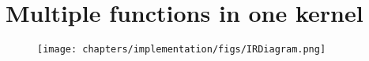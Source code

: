 \section{Multiple functions in one kernel}

\begin{figure}[!htb]
    \texttt{[image: chapters/implementation/figs/IRDiagram.png]}
\end{figure}